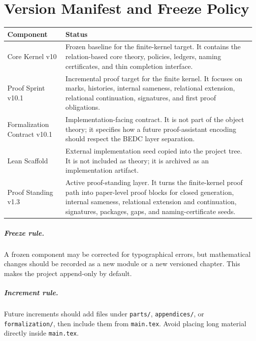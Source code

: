 
\chapter*{Version Manifest and Freeze Policy}
\begin{longtable}{p{}p{}}
\toprule
\textbf{Component} & \textbf{Status}\\
\midrule
Core Kernel v10 & Frozen baseline for the finite-kernel target. It contains the relation-based core theory, policies, ledgers, naming certificates, and thin completion interface.\\
Proof Sprint v10.1 & Incremental proof target for the finite kernel. It focuses on marks, histories, internal sameness, relational extension, relational continuation, signatures, and first proof obligations.\\
Formalization Contract v10.1 & Implementation-facing contract. It is not part of the object theory; it specifies how a future proof-assistant encoding should respect the BEDC layer separation.\\
Lean Scaffold & External implementation seed copied into the project tree. It is not included as theory; it is archived as an implementation artifact.\\
Proof Standing v1.3 & Active proof-standing layer. It turns the finite-kernel proof path into paper-level proof blocks for closed generation, internal sameness, relational extension and continuation, signatures, packages, gaps, and naming-certificate seeds.\\
\bottomrule
\end{longtable}

\paragraph{Freeze rule.}
A frozen component may be corrected for typographical errors, but mathematical changes should be recorded as a new module or a new versioned chapter. This makes the project append-only by default.

\paragraph{Increment rule.}
Future increments should add files under \texttt{parts/}, \texttt{appendices/}, or \texttt{formalization/}, then include them from \texttt{main.tex}. Avoid placing long material directly inside \texttt{main.tex}.


